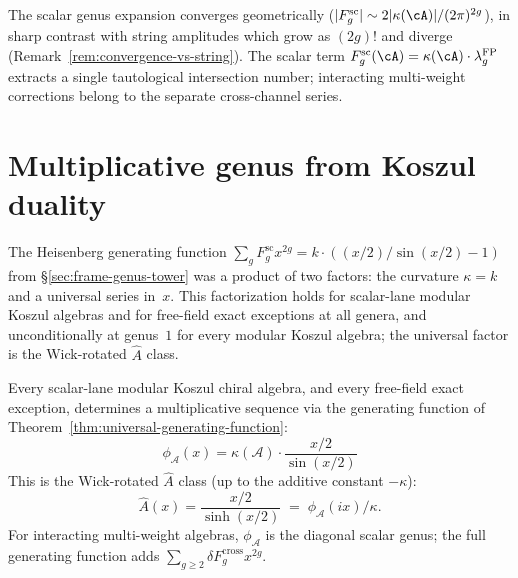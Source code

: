 \begin{remark}

\label{rem:growth-vs-string}
The scalar genus expansion converges geometrically
($|F_g^{\mathrm{sc}}| \sim 2|\kappa(\cA)|/(2\pi)^{2g}$), in sharp contrast with
string amplitudes which grow as $(2g)!$ and diverge
(Remark~\ref{rem:convergence-vs-string}). The scalar term
$F_g^{\mathrm{sc}}(\cA)
=\kappa(\cA) \cdot \lambda_g^{\mathrm{FP}}$ extracts a single
tautological intersection number; interacting multi-weight
corrections belong to the separate cross-channel series.
\end{remark}


\section{Multiplicative genus from Koszul duality}\label{sec:multiplicative-genus}

The Heisenberg generating function
$\sum_g F_g^{\mathrm{sc}} x^{2g}
= k \cdot ((x/2)/\sin(x/2) - 1)$
from \S\ref{sec:frame-genus-tower} was a product of two factors: the
curvature $\kappa = k$ and a universal series in~$x$. This
factorization holds for scalar-lane modular Koszul algebras and for
free-field exact exceptions at all genera, and unconditionally at
genus~$1$ for every modular Koszul algebra; the universal factor is
the Wick-rotated $\hat{A}$ class.

\begin{proposition}
\label{prop:multiplicative-genus}
Every scalar-lane modular Koszul chiral algebra, and every
free-field exact exception, determines a multiplicative sequence
via the generating function of
Theorem~\textup{\ref{thm:universal-generating-function}}:
\begin{equation}\label{eq:multiplicative-genus}
\phi_{\mathcal{A}}(x) = \kappa(\mathcal{A}) \cdot \frac{x/2}{\sin(x/2)}
\end{equation}
This is the Wick-rotated $\hat{A}$ class \textup{(}up to the additive
constant $-\kappa$\textup{)}:
\begin{equation}
\hat{A}(x) = \frac{x/2}{\sinh(x/2)} \;=\; \phi_{\mathcal{A}}(ix)/\kappa.
\end{equation}
For interacting multi-weight algebras, $\phi_{\mathcal A}$ is the
diagonal scalar genus; the full generating function adds
$\sum_{g\geq2}\delta F_g^{\mathrm{cross}}x^{2g}$.
\end{proposition}

